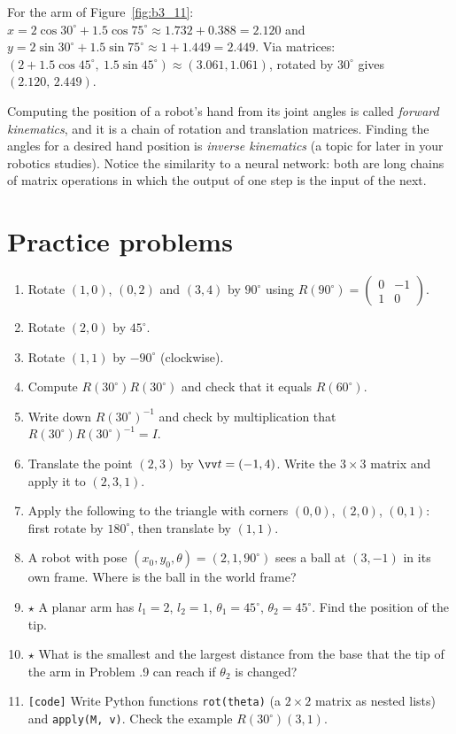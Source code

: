 \begin{example}
For the arm of Figure~\ref{fig:b3_11}: $x=2\cos30^\circ+1.5\cos75^\circ\approx1.732+0.388=2.120$ and $y=2\sin30^\circ+1.5\sin75^\circ\approx1+1.449=2.449$. Via matrices: $(2+1.5\cos45^\circ,\ 1.5\sin45^\circ)\approx(3.061,1.061)$, rotated by $30^\circ$ gives $(2.120,\,2.449)$.
\end{example}

\begin{aibox}
Computing the position of a robot's hand from its joint angles is called \emph{forward kinematics}, and it is a chain of rotation and translation matrices. Finding the angles for a desired hand position is \emph{inverse kinematics} (a topic for later in your robotics studies). Notice the similarity to a neural network: both are long chains of matrix operations in which the output of one step is the input of the next.
\end{aibox}

\section*{Practice problems}
\begin{enumerate}[label=\textbf{\thechapter.\arabic*}]
  \item Rotate $(1,0)$, $(0,2)$ and $(3,4)$ by $90^\circ$ using $R(90^\circ)=\begin{pmatrix}0&-1\\1&0\end{pmatrix}$.
  \item Rotate $(2,0)$ by $45^\circ$.
  \item Rotate $(1,1)$ by $-90^\circ$ (clockwise).
  \item Compute $R(30^\circ)R(30^\circ)$ and check that it equals $R(60^\circ)$.
  \item Write down $R(30^\circ)^{-1}$ and check by multiplication that $R(30^\circ)R(30^\circ)^{-1}=I$.
  \item Translate the point $(2,3)$ by $\vv t=(-1,4)$. Write the $3\times3$ matrix and apply it to $(2,3,1)$.
  \item Apply the following to the triangle with corners $(0,0)$, $(2,0)$, $(0,1)$: first rotate by $180^\circ$, then translate by $(1,1)$.
  \item A robot with pose $(x_0,y_0,\theta)=(2,1,90^\circ)$ sees a ball at $(3,-1)$ in its own frame. Where is the ball in the world frame?
  \item $\star$ A planar arm has $l_1=2$, $l_2=1$, $\theta_1=45^\circ$, $\theta_2=45^\circ$. Find the position of the tip.
  \item $\star$ What is the smallest and the largest distance from the base that the tip of the arm in Problem \thechapter.9 can reach if $\theta_2$ is changed?
  \item \texttt{[code]} Write Python functions \texttt{rot(theta)} (a $2\times2$ matrix as nested lists) and \texttt{apply(M, v)}. Check the example $R(30^\circ)(3,1)$.
\end{enumerate}

\newpage

